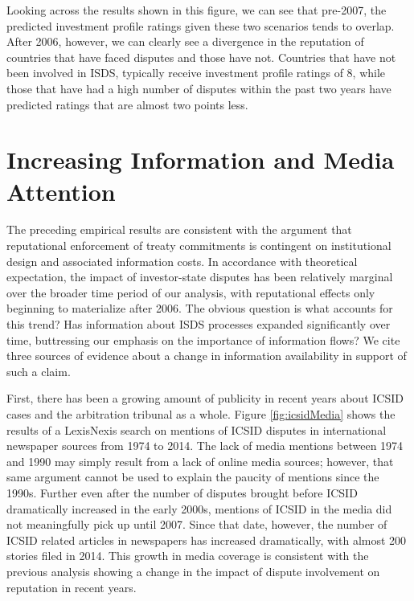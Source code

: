 \documentclass[12pt,onesided]{amsart}
\begin{document}
Looking across the results shown in this figure, we can see that pre-2007, the predicted investment profile ratings given these two scenarios tends to overlap. After 2006, however, we can clearly see a divergence in the reputation of countries that have faced disputes and those have not. Countries that have not been involved in ISDS, typically receive investment profile ratings of 8, while those that have had a high number of disputes within the past two years have predicted ratings that are almost two points less. 


\section*{Increasing Information and Media Attention}

The preceding empirical results are consistent with the argument that reputational enforcement of treaty commitments is contingent on institutional design and associated information costs. In accordance with theoretical expectation, the impact of investor-state disputes has been relatively marginal over the broader time period of our analysis, with reputational effects only beginning to materialize after 2006. The obvious question is what accounts for this trend? Has information about ISDS processes expanded significantly over time, buttressing our emphasis on the importance of information flows? We cite three sources of evidence about a change in information availability in support of such a claim. 

First, there has been a growing amount of publicity in recent years about ICSID cases and the arbitration tribunal as a whole. Figure \ref{fig:icsidMedia} shows the results of a LexisNexis search on mentions of ICSID disputes in international newspaper sources from 1974 to 2014. The lack of media mentions between 1974 and 1990 may simply result from a lack of online media sources; however, that same argument cannot be used to explain the paucity of mentions since the 1990s. Further even after the number of disputes brought before ICSID dramatically increased in the early 2000s, mentions of ICSID in the media did not meaningfully pick up until 2007. Since that date, however, the number of ICSID related articles in newspapers has increased dramatically, with almost 200 stories filed in 2014. This growth in media coverage is consistent with the previous analysis showing a change in the impact of dispute involvement on reputation in recent years.
\end{document}
